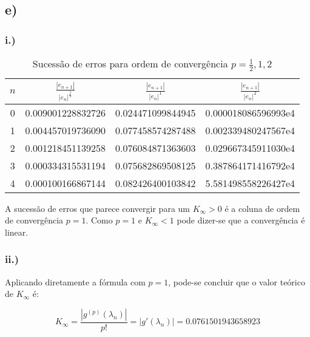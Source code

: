 \documentclass[a4paper, 18pt]{article}
\begin{document}
\subsection*{e)}
	\subsubsection*{i.)}
	
	\begin{table}[H]
		\setlength{\tabcolsep}{0.5cm} %
		\renewcommand{\arraystretch}{1.5} %
		\centering
		\caption{Sucessão de erros para ordem de convergência $p = \frac{1}{2}, 1, 2$}
		\label{2e_table}
		\begin{tabular}{|c|c|c|c|}
			$n$ & $\frac{|e_{n+1}|}{|e_n|^{\frac{1}{2}}}$ &  $\frac{|e_{n+1}|}{|e_n|^1}$ & $\frac{|e_{n+1}|}{|e_n|^{2}}$ \\\hline
			0 & 0.009001228832726 & 0.024471099844945 & 0.000018086596993e4 \\
			1 & 0.004457019736090 & 0.077458574287488 & 0.002339480247567e4 \\
			2 & 0.001218451139258 & 0.076084871363603 & 0.029667345911030e4 \\
			3 & 0.000334315531194 & 0.075682869508125 & 0.387864171416792e4 \\
			4 & 0.000100166867144 & 0.082426400103842 & 5.581498558226427e4 \\
		\end{tabular}
	\end{table}

	\par
	A sucessão de erros que parece convergir para um $K_\infty > 0$ é a coluna de ordem de convergência $p = 1$. Como $p = 1$ e $K_\infty < 1$ pode dizer-se que a convergência é linear.


\subsubsection*{ii.)}
	\par
	Aplicando diretamente a fórmula com $p = 1$, pode-se concluir que o valor teórico de $K_\infty$ é:

	$$K_\infty = \frac{|g^{(p)}(\lambda_n)|}{p!} = |g'(\lambda_n)| = 0.0761501943658923$$
\end{document}
